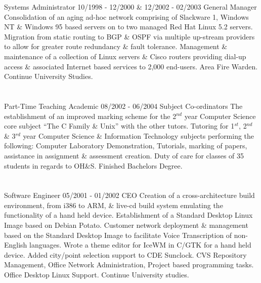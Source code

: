  Systems Administrator
\lskip
{} 10/1998 - 12/2000 \& 12/2002 - 02/2003
 General Manager
 Consolidation of an aging ad-hoc network comprising of Slackware 1, Windows NT \& Windows 95 based servers on to two managed Red Hat Linux 5.2 servers.
\dashtopic Migration from static routing to BGP \& OSPF via multiple up-stream providers to allow for greater route redundancy \& fault tolerance.
 Management \& maintenance of a collection of Linux servers \& Cisco routers providing dial-up access \& associated Internet based services to 2,000 end-users.
\dashtopic Area Fire Warden.
 Continue University Studies.
\pskip

\section{\UOW}

\lskip
{} Part-Time Teaching Academic
 08/2002 - 06/2004
 Subject Co-ordinators
 The establishment of an improved marking scheme for the 2$^{nd}$ year Computer Science core subject ``The C Family \& Unix'' with the other tutors.
 Tutoring for 1$^{st}$, 2$^{nd}$ \& 3$^{rd}$ year Computer Science \& Information Technology subjects performing the following: Computer Laboratory Demonstration, Tutorials, marking of papers, assistance in assignment \& assessment creation.
\dashtopic Duty of care for classes of 35 students in regards to OH\&S.
 Finished Bachelors Degree.
\pskip

\section{\FST}

\lskip
{} Software Engineer
 05/2001 - 01/2002
 CEO
 Creation of a cross-architecture build environment, from i386 to ARM, \& live-cd build system emulating the functionality of a hand held device.
\dashtopic Establishment of a Standard Desktop Linux Image based on Debian {\mi Potato}.
\dashtopic Customer network deployment \& management based on the Standard Desktop Image to facilitate Voice Transcription of non-English languages.
\dashtopic Wrote a theme editor for IceWM in C/GTK for a hand held device.
\dashtopic Added city/point selection support to CDE Sunclock.
 CVS Repository Management, Office Network Administration, Project based programming tasks.
\dashtopic Office Desktop Linux Support.
 Continue University studies.
\pskip

